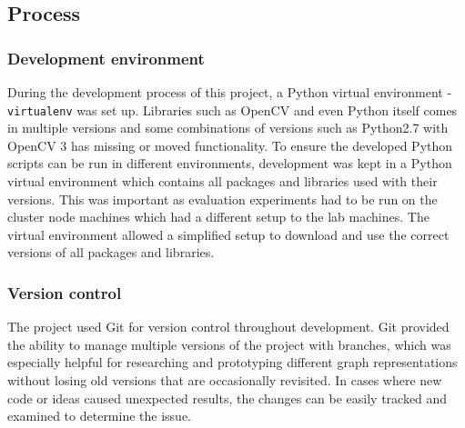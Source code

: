 \subsection{Process}

\subsubsection{Development environment}
During the development process of this project, a Python virtual environment - \texttt{virtualenv} was set up. Libraries such as OpenCV and even Python itself comes in multiple versions and some combinations of versions such as Python2.7 with OpenCV 3 has missing or moved functionality. To ensure the developed Python scripts can be run in different environments, development was kept in a Python virtual environment which contains all packages and libraries used with their versions. This was important as evaluation experiments had to be run on the cluster node machines which had a different setup to the lab machines. The virtual environment allowed a simplified setup to download and use the correct versions of all packages and libraries.

\subsubsection{Version control}
The project used Git for version control throughout development. Git provided the ability to manage multiple versions of the project with branches, which was especially helpful for researching and prototyping different graph representations without losing old versions that are occasionally revisited. In cases where new code or ideas caused unexpected results, the changes can be easily tracked and examined to determine the issue.


